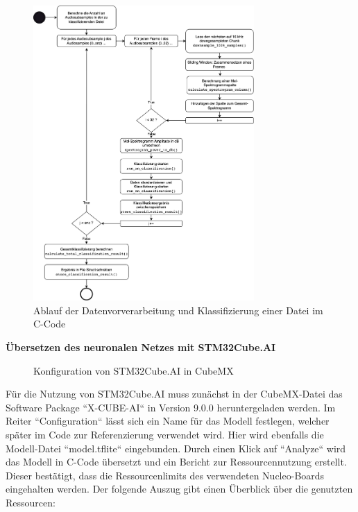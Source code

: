 \begin{figure}[h!]
\centering
\includegraphics[width=0.75\textwidth]{images/08_durchfuehrung/nn/ablauf_klassifizierung_c.png}
\caption{Ablauf der Datenvorverarbeitung und Klassifizierung einer Datei im C-Code}
\label{fig:img-nn-ablaufdiagramm}
\end{figure}

\newpage
\textbf{Übersetzen des neuronalen Netzes mit STM32Cube.AI}


\begin{figure} %
	\vspace{-20pt + 0.02\textwidth}
	\hspace{0.02\textwidth} %
	\caption{Konfiguration von STM32Cube.AI in CubeMX}
	\label{fig:img-training-graph}
\end{figure}

Für die Nutzung von STM32Cube.AI muss zunächst in der CubeMX-Datei das Software Package ``X-CUBE-AI`` in Version 9.0.0 heruntergeladen werden. Im Reiter ``Configuration`` lässt sich ein Name für das Modell festlegen, welcher später im Code zur Referenzierung verwendet wird. Hier wird ebenfalls die Modell-Datei ``model.tflite`` eingebunden. Durch einen Klick auf ``Analyze`` wird das Modell in C-Code übersetzt und ein Bericht zur Ressourcennutzung erstellt. Dieser bestätigt, dass die Ressourcenlimits des verwendeten Nucleo-Boards eingehalten werden. Der folgende Auszug gibt einen Überblick über die genutzten Ressourcen:

